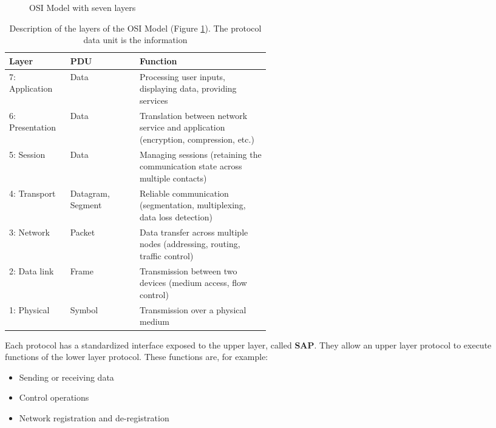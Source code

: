 \begin{refsection}
\begin{figure}[H]
	\caption[OSI Model with seven layers]{\ac{OSI} Model with seven layers}
	\label{fig:ch01:osi_model}
\end{figure}

\begin{table}[H]
	\caption[Description of the layers of the OSI Model]{Description of the layers of the \ac{OSI} Model (Figure \ref{fig:ch01:osi_model}). The protocol data unit is the information }
	\begin{tabular}{|l|l|p{0.5\linewidth}|}
		\hline
		Layer & PDU & Function \\
		\hline
		\hline
		7: Application & Data & Processing user inputs, displaying data, providing services \\
		\hline
		6: Presentation & Data & Translation between network service and application (encryption, compression, etc.) \\
		\hline
		5: Session & Data & Managing sessions (retaining the communication state across multiple contacts) \\
		\hline
		4: Transport & Datagram, Segment & Reliable communication (segmentation, multiplexing, data loss detection) \\
		\hline
		3: Network & Packet & Data transfer across multiple nodes (addressing, routing, traffic control) \\
		\hline
		2: Data link & Frame & Transmission between two devices (medium access, flow control) \\
		\hline
		1: Physical & Symbol & Transmission over a physical medium \\
		\hline
	\end{tabular}
\end{table}

Each protocol has a standardized interface exposed to the upper layer, called  \textbf{\ac{SAP}}. They allow an upper layer protocol to execute functions of the lower layer protocol. These functions are, for example:
\begin{itemize}
	\item Sending or receiving data
	\item Control operations
	\item Network registration and de-registration
\end{itemize}


\end{refsection}

